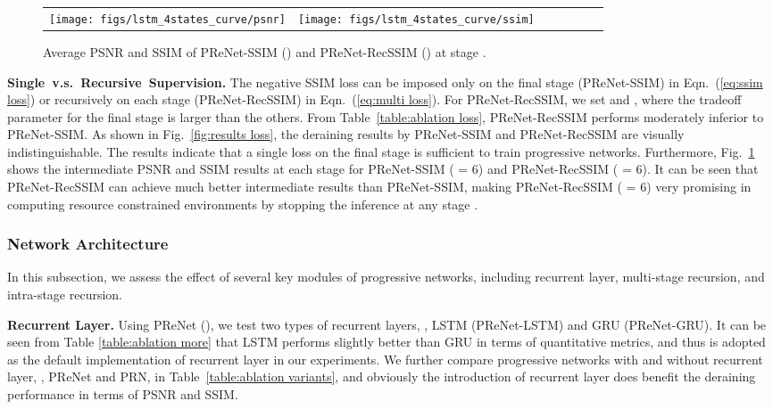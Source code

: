 \documentclass[10pt,twocolumn,letterpaper]{article}
\begin{document}
\begin{figure}[!htb]\footnotesize
	\setlength{\tabcolsep}{1pt}
	\centering
	\begin{tabular}{ccccccc}
		\!\!\!\!\!\! \texttt{[image: figs/lstm\_4states\_curve/psnr]} &
		\texttt{[image: figs/lstm\_4states\_curve/ssim]}
	\end{tabular}
	\caption{Average PSNR and SSIM of PReNet-SSIM () and PReNet-RecSSIM () at stage .}
	\label{fig:4states curve}
\end{figure}




\vspace{.05in}
\noindent \textbf{Single~v.s.~Recursive~Supervision.}
The negative SSIM loss can be imposed only on the final stage (PReNet-SSIM) in Eqn.~(\ref{eq:ssim loss}) or recursively on each stage (PReNet-RecSSIM) in Eqn.~(\ref{eq:multi loss}).
For PReNet-RecSSIM, we set  and , where the tradeoff parameter for the final stage is larger than the others.
From Table~\ref{table:ablation loss}, PReNet-RecSSIM performs moderately inferior to PReNet-SSIM.
As shown in Fig.~\ref{fig:results loss}, the deraining results by PReNet-SSIM and PReNet-RecSSIM are visually indistinguishable.
The results indicate that a single loss on the final stage is sufficient to train progressive networks.
Furthermore, Fig.~\ref{fig:4states curve} shows the intermediate PSNR and SSIM results at each stage for PReNet-SSIM ( = 6) and PReNet-RecSSIM ( = 6).
It can be seen that PReNet-RecSSIM can achieve much better intermediate results than PReNet-SSIM, making PReNet-RecSSIM ( = 6) very promising in computing resource constrained environments by stopping the inference at any stage .

















\subsubsection{Network Architecture}
In this subsection, we assess the effect of several key modules of progressive networks, including recurrent layer, multi-stage recursion, and intra-stage recursion.

\vspace{.05in}
\noindent \textbf{Recurrent Layer.} Using PReNet (), we test two types of recurrent layers, \ie, LSTM (PReNet-LSTM) and GRU (PReNet-GRU).
It can be seen from Table \ref{table:ablation more} that LSTM performs slightly better than GRU in terms of quantitative metrics, and thus is adopted as the default implementation of recurrent layer in our experiments.
We further compare progressive networks with and without recurrent layer, \ie, PReNet and PRN, in Table~\ref{table:ablation variants}, and obviously the introduction of recurrent layer does benefit the deraining performance in terms of PSNR and SSIM.
\end{document}
